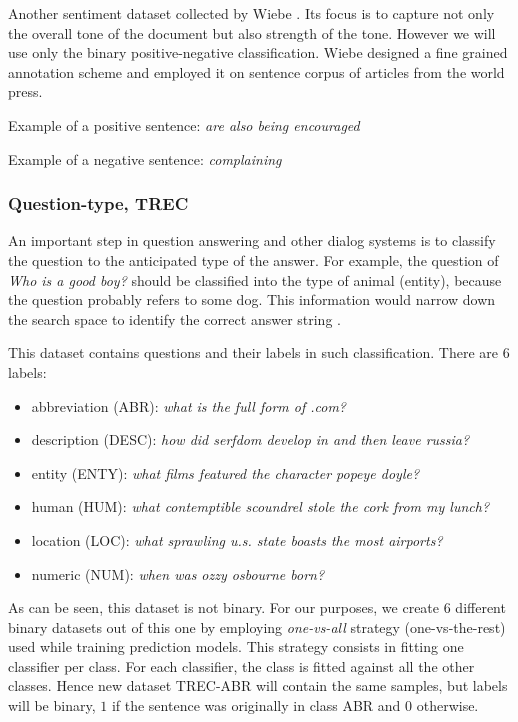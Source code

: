     Another sentiment dataset collected by Wiebe \cite{wiebe2005annotating}.
    Its focus is to capture not only the overall tone of the document but also strength of the tone.
    However we will use only the binary positive-negative classification.
    Wiebe designed a fine grained annotation scheme and employed it on sentence corpus of articles from the world press.
    
    Example of a positive sentence:
    \emph{are also being encouraged}
    
    Example of a negative sentence:
    \emph{complaining}  \* %

    
    \subsubsection{Question-type, TREC}
    
    An important step in question answering and other dialog systems is to classify the  question to the anticipated type of the answer. 
    For example, the question of \emph{Who is a good boy?} should be classified into the type of animal (entity), because the question probably refers to some dog.  
    This information would narrow down the search space to identify the correct answer string \cite{huang2008question}. 
    
    This dataset contains questions and their labels in such classification.
    There are $6$ labels: 
    
    \begin{itemize}
        \item abbreviation (ABR): \emph{what is the full form of .com?}
        \item description (DESC): \emph{how did serfdom develop in and then leave russia?}
        \item entity (ENTY): \emph{what films featured the character popeye doyle?}
        \item human (HUM): \emph{what contemptible scoundrel stole the cork from my lunch?}
        \item location (LOC): \emph{what sprawling u.s. state boasts the most airports?}
        \item numeric (NUM): \emph{when was ozzy osbourne born?}
    \end{itemize}
    
    As can be seen, this dataset is not binary. 
    For our purposes, we create $6$ different binary datasets out of this one by employing \emph{one-vs-all} strategy (one-vs-the-rest) used while training prediction models.
    This strategy consists in fitting one classifier per class. 
    For each classifier, the class is fitted against all the other classes. 
    Hence new dataset TREC-ABR will contain the same samples, but labels will be binary, $1$ if the sentence was originally in class ABR and $0$ otherwise.
    
